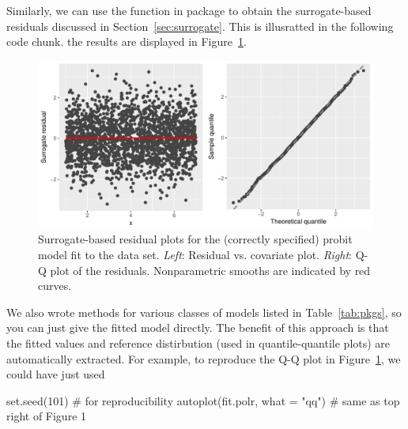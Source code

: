 Similarly, we can use the  function in package  to obtain the surrogate-based residuals discussed in Section~\ref{sec:surrogate}. This is illusratted in the following code chunk. the results are displayed in Figure~\ref{fig:quadratic-correct-surrogate}.
\begin{figure}[!htbp]
  \centering
  \includegraphics[width=1\textwidth]{quadratic-correct-surrogate}
  \caption{Surrogate-based residual plots for the (correctly specified) probit model fit to the  data set. \textit{Left}: Residual vs. covariate plot. \textit{Right}: Q-Q plot of the residuals. Nonparametric smooths are indicated by red curves.}
  \label{fig:quadratic-correct-surrogate}
\end{figure}

We also wrote  methods for various classes of models listed in Table~\ref{tab:pkgs}, so you can just give  the fitted model directly. The benefit of this approach is that the fitted values and reference distirbution (used in quantile-quantile plots) are automatically extracted. For example, to reproduce the Q-Q plot in Figure~\ref{fig:quadratic-correct-surrogate}, we could have just used
\begin{example}
set.seed(101)  # for reproducibility
autoplot(fit.polr, what = "qq")  # same as top right of Figure 1
\end{example}

